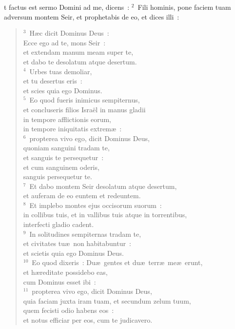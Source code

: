 \bchapter
{}t factus est sermo Domini ad me, dicens~:
${}^{2}$~Fili hominis, pone faciem tuam adversum montem Seir, et prophetabis de eo, et dices illi~:
\begin{flushleft}\begin{verse}${}^{3}$~H\ae c dicit Dominus Deus~:\\ Ecce ego ad te, mons Seir~:\\ et extendam manum meam super te,\\ et dabo te desolatum atque desertum.\\
${}^{4}$~Urbes tuas demoliar,\\ et tu desertus eris~:\\ et scies quia ego Dominus.\\
${}^{5}$~Eo quod fueris inimicus sempiternus,\\ et concluseris filios Isra\"el in manus gladii\\ in tempore afflictionis eorum,\\ in tempore iniquitatis extrem\ae~:\\
${}^{6}$~propterea vivo ego, dicit Dominus Deus,\\ quoniam sanguini tradam te,\\ et sanguis te persequetur~:\\ et cum sanguinem oderis,\\ sanguis persequetur te.\\
${}^{7}$~Et dabo montem Seir desolatum atque desertum,\\ et auferam de eo euntem et redeuntem.\\
${}^{8}$~Et implebo montes ejus occisorum suorum~:\\ in collibus tuis, et in vallibus tuis atque in torrentibus,\\ interfecti gladio cadent.\\
${}^{9}$~In solitudines sempiternas tradam te,\\ et civitates tu\ae\ non habitabuntur~:\\ et scietis quia ego Dominus Deus.\\
${}^{10}$~Eo quod dixeris~: Du\ae\ gentes et du\ae\ terr\ae\ me\ae\ erunt,\\ et h\ae reditate possidebo eas,\\ cum Dominus esset ibi~:\\
${}^{11}$~propterea vivo ego, dicit Dominus Deus,\\ quia faciam juxta iram tuam, et secundum zelum tuum,\\ quem fecisti odio habens eos~:\\ et notus efficiar per eos, cum te judicavero.\\

\end{verse}
\end{flushleft}

